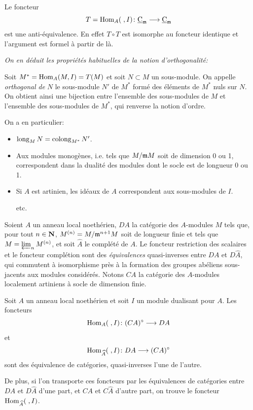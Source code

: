 Le foncteur
$$
T=\Hom_{A}(\;, I)\colon \ccat_{\mm}\to \ccat_{\mm}
$$
est une anti-\'equivalence. En effet $T\circ T$ est isomorphe au foncteur identique et l'argument est formel \`a partir de l\`a.

\emph{On en déduit les propriétés habituelles de la notion d'orthogonalité:}

Soit $M^{*}=\operatorname{Hom}_{A}(M, I)=T(M)$ et soit $N\subset M$ un sous-module. On appelle \emph{orthogonal de} $N$ le sous-module $N'$ de $M^{*}$ form\'e des \'el\'ements de $M^*$ nuls sur $N$. On obtient ainsi une bijection entre l'ensemble des sous-modules de $M$ et l'ensemble des sous-modules de $M^{*}$, qui renverse la notion d'ordre.

On a en particulier:
\begin{itemize}
\item
$\operatorname{long}_{M}N=\operatorname{colong}_{M^{*}}N'$.
\item
Aux modules monog\`enes, i.e. tels que $M/\mathfrak{m} M$ soit de dimension 0 ou 1, correspondent dans la dualit\'e des modules dont le socle est de longueur 0 ou 1.
\item
Si $A$ est artinien, les id\'eaux de $A$ correspondent aux sous-modules de $I$.
\par\hfill etc.
\end{itemize}

\smallskip
Soient $A$ un anneau local noeth\'erien, $DA$ la cat\'egorie des $A$-modules $M$ tels que, pour tout $n\in {\bf N}$, $M^{(n)}=M/\mathfrak{m}^{n+1}M$ soit de longueur finie et tels que $M=\varprojlim_{n}M^{(n)}$, et soit $\hat{A}$ le compl\'et\'e de $A$. Le foncteur restriction des scalaires et le foncteur compl\'etion sont des \emph{équivalences} quasi-inverses entre $DA$ et $D\hat{A}$, qui commutent \`a isomorphisme pr\`es \`a la formation des groupes ab\'eliens sous-jacents aux modules consid\'er\'es. Notons $CA$ la cat\'egorie des $A$-modules localement artiniens \`a socle de dimension finie.

\begin{proposition} \label{IV.5.1}
Soit $A$ un anneau local noeth\'erien et soit $I$ un module dualisant pour $A$. Les foncteurs
$$
\Hom_{A}(\;, I)\colon (CA)^{\circ}\to DA
$$
et
$$
\Hom_{\hat{A}}(\;, I)\colon DA\to (CA)^{\circ}
$$
sont des \'equivalence de cat\'egories, quasi-inverses l'une de l'autre.

De plus, si l'on transporte ces foncteurs par les \'equivalences de cat\'egories entre $DA$ et $D\hat{A}$ d'une part, et $CA$ et $C\hat{A}$ d'autre part, on trouve le foncteur $\operatorname{Hom}_{\widehat{A}}(\;, I)$.
\end{proposition}

